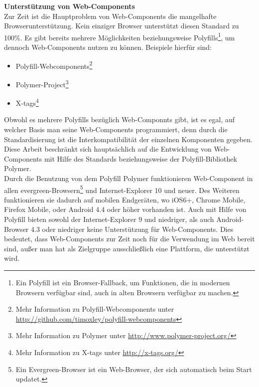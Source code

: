 \textbf{Unterstützung von Web-Components}\\
Zur Zeit ist die Hauptproblem von Web-Components die mangelhafte Browserunterstützung. Kein einziger Browser unterstützt diesen Standard zu 100\%. Es gibt bereits mehrere Möglichkeiten beziehungsweise Polyfills\footnote{Ein Polyfill ist ein Browser-Fallback, um Funktionen, die in modernen Browsern verfügbar sind, auch in alten Browsern verfügbar zu machen.}, um dennoch Web-Components nutzen zu können. Beispiele hierfür sind:
\begin{itemize}
\item Polyfill-Webcomponents\footnote{Mehr Information zu Polyfill-Webcomponents unter \href{http://github.com/timoxley/polyfill-webcomponents}{http://github.com/timoxley/polyfill-webcomponents}}
\item Polymer-Project\footnote{Mehr Information zu Polymer unter \href{http://www.polymer-project.org/}{http://www.polymer-project.org/}}
\item X-tags\footnote{Mehr Information zu X-tags unter \href{http://x-tags.org/}{http://x-tags.org/}}
\end{itemize}
Obwohl es mehrere Polyfills bezüglich Web-Componnts gibt, ist es egal, auf welcher Basis man seine Web-Components programmiert, denn durch die Standardisierung ist die Interkompatibilität der einzelnen Komponenten gegeben. Diese Arbeit beschränkt sich hauptsächlich auf die Entwicklung von Web-Components mit Hilfe des Standards beziehungsweise der Polyfill-Bibliothek Polymer.\\
Durch die Benutzung von dem Polyfill Polymer funktionieren Web-Component in allen \glqq evergreen\grqq -Browsern\footnote{Ein \glqq Evergreen\grqq -Browser ist ein Web-Browser, der sich automatisch beim Start updatet.} und Internet-Explorer 10 und neuer. Des Weiteren funktionieren sie dadurch auf mobilen Endgeräten, wo iOS6+, Chrome Mobile, Firefox Mobile, oder Android 4.4 oder höher vorhanden ist. Auch mit Hilfe von Polyfill bieten sowohl der Internet-Explorer 9 und niedriger, als auch Android-Browser 4.3 oder niedriger keine Unterstützung für Web-Components. Dies bedeutet, dass Web-Components zur Zeit noch für die Verwendung im Web bereit sind, außer man hat als Zielgruppe ausschließlich eine Plattform, die unterstützt wird.

